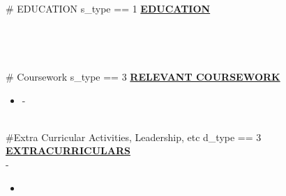 \documentclass{article}
\begin{document}
\#{ EDUCATION s_type == 1 }
\noindent \textbf{\underline{EDUCATION}} \\

\textbf{} \\
 \hfill {} \\
\textit{}\\
~\\

\#{ Coursework s_type == 3 }
\noindent \textbf{\underline{RELEVANT COURSEWORK}}\\

\begin{itemize}[noitemsep,nolistsep,leftmargin=*]
    \item {\textbf{} - }
\end{itemize}
~\\

\#{Extra Curricular Activities, Leadership, etc d_type == 3}
\noindent \textbf{\underline{EXTRACURRICULARS}} \\

\noindent \textbf{} \hfill {} - 
\begin{itemize}[noitemsep,nolistsep,leftmargin=*]
    \item {}
\end{itemize}
\end{document}
